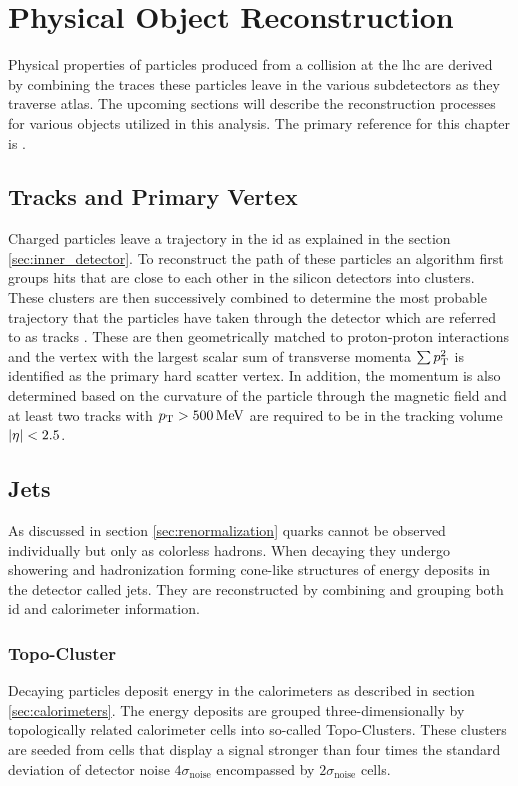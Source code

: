 \chapter{Physical Object Reconstruction}\label{ch:reco}

Physical properties of particles produced from a collision at the \ac{lhc} are derived by combining the traces these particles leave in the various subdetectors as they traverse \ac{atlas}. The upcoming sections will describe the reconstruction processes for various objects utilized in this analysis. The primary reference for this chapter is \citep{atlas2021optimisation}.

\section{Tracks and Primary Vertex}\label{sec:tracks}
Charged particles leave a trajectory in the \ac{id} as explained in the section \ref{sec:inner_detector}. To reconstruct the path of these particles an algorithm first groups hits that are close to each other in the silicon detectors into clusters. These clusters are then successively combined to determine the most probable trajectory that the particles have taken through the detector which are referred to as tracks \citep{aaboud2017performance}. These are then geometrically matched to proton-proton interactions and the vertex with the largest scalar sum of transverse momenta $\sum p_{\text{T}}^2$ is identified as the primary hard scatter vertex. In addition, the momentum is also determined based on the curvature of the particle through the magnetic field and at least two tracks with $p_{\text{T}}>\qty[]{500}{MeV}$ are required to be in the tracking volume $\left\vert\eta\right\vert<2.5$.

\section{Jets}\label{sec:jets}
As discussed in section \ref{sec:renormalization} quarks cannot be observed individually but only as colorless hadrons. When decaying they undergo showering and hadronization forming cone-like structures of energy deposits in the detector called jets. They are reconstructed by combining and grouping both \ac{id} and calorimeter information.

\subsection{Topo-Cluster}
Decaying particles deposit energy in the calorimeters as described in section \ref{sec:calorimeters}. The energy deposits are grouped three-dimensionally by topologically related calorimeter cells into so-called Topo-Clusters. These clusters are seeded from cells that display a signal stronger than four times the standard deviation of detector noise $4\sigma_\mathrm{noise}$ encompassed by $2\sigma_\mathrm{noise}$ cells.

